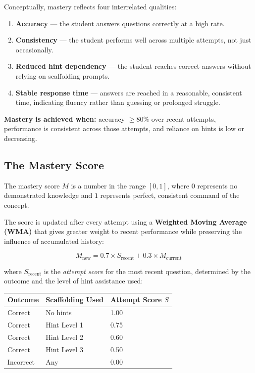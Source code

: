 \documentclass[12pt,a4paper]{article}
\begin{document}
Conceptually, mastery reflects four interrelated qualities:

\begin{enumerate}[leftmargin=2em]
  \item \textbf{Accuracy} — the student answers questions correctly at a high
        rate.
  \item \textbf{Consistency} — the student performs well across multiple
        attempts, not just occasionally.
  \item \textbf{Reduced hint dependency} — the student reaches correct answers
        without relying on scaffolding prompts.
  \item \textbf{Stable response time} — answers are reached in a reasonable,
        consistent time, indicating fluency rather than guessing or
        prolonged struggle.
\end{enumerate}

\begin{greenbox}
\textbf{Mastery is achieved when:} accuracy $\geq 80\%$ over recent attempts,
performance is consistent across those attempts, and reliance on hints is low
or decreasing.
\end{greenbox}

\subsection{The Mastery Score}

The mastery score $M$ is a number in the range $[0, 1]$, where $0$ represents
no demonstrated knowledge and $1$ represents perfect, consistent command of
the concept.

The score is updated after every attempt using a \textbf{Weighted Moving
Average (WMA)} that gives greater weight to recent performance while
preserving the influence of accumulated history:

\begin{equation}
  M_{\text{new}} = 0.7 \times S_{\text{recent}} + 0.3 \times M_{\text{current}}
  \label{eq:wma}
\end{equation}

\noindent where $S_{\text{recent}}$ is the \emph{attempt score} for the most
recent question, determined by the outcome and the level of hint assistance
used:

\begin{center}
\begin{tabular}{lll}
  \toprule
  \textbf{Outcome} & \textbf{Scaffolding Used} & \textbf{Attempt Score $S$} \\
  \midrule
  Correct & No hints            & 1.00 \\
  Correct & Hint Level 1        & 0.75 \\
  Correct & Hint Level 2        & 0.60 \\
  Correct & Hint Level 3        & 0.50 \\
  Incorrect & Any               & 0.00 \\
  \bottomrule
\end{tabular}
\end{center}
\end{document}
